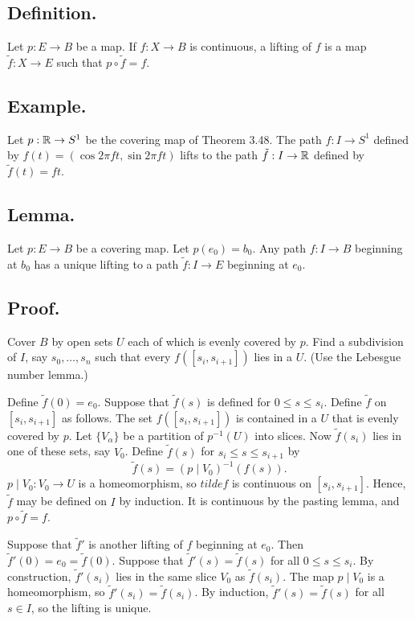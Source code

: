 \documentclass[titlepage]{article}
\begin{document}
\subsection{Definition.} Let $p: E \to B$ be a map. If $f: X \to B$ is continuous, a lifting of $f$ is a map $\tilde{f}: X \to E$ such that $p \circ \tilde{f} = f$.

\subsection{Example.} Let $p: \mathbb{R} \to S^{1}$ be the covering map of Theorem 3.48. The path $f: I \to S^{1}$ defined by $f(t) = (\cos 2\pi ft, \sin 2\pi ft)$ lifts to the path $\tilde{f}: I \to \mathbb{R}$ defined by $\tilde{f}(t) = ft$.

\subsection{Lemma.} Let $p: E \to B$ be a covering map. Let $p(e_{0}) = b_{0}$. Any path $f: I \to B$ beginning at $b_{0}$ has a unique lifting to a path $\tilde{f}: I \to E$ beginning at $e_{0}$.

\subsection{Proof.} Cover $B$ by open sets $U$ each of which is evenly covered by $p$.  Find a subdivision of $I$, say $s_{0}, \ldots, s_{n}$ such that every $f([s_{i}, s_{i+1}])$ lies in a $U$. (Use the Lebesgue number lemma.)

Define $\tilde{f}(0) = e_{0}$. Suppose that $\tilde{f}(s)$ is defined for $0 \leq s \leq s_{i}$. Define $\tilde{f}$ on $[s_{i}, s_{i+1}]$ as follows. The set $f([s_{i}, s_{i+1}])$ is contained in a $U$ that is evenly covered by $p$. Let $\{V_{\alpha}\}$ be a partition of $p^{-1}(U)$ into slices. Now $\tilde{f}(s_{i})$ lies in one of these sets, say $V_{0}$. Define $\tilde{f}(s)$ for $s_{i} \leq s \leq s_{i+1}$ by 
$$\tilde{f}(s) = (p \mid V_{0})^{-1}(f(s)).$$
$p \mid V_{0}: V_{0} \to U$ is a homeomorphism, so $tilde{f}$ is continuous on $[s_{i}, s_{i+1}]$. Hence, $\tilde{f}$ may be defined on $I$ by induction. It is continuous by the pasting lemma, and $p \circ \tilde{f} = f$.

Suppose that $\tilde{f}'$ is another lifting of $f$ beginning at $e_{0}$. Then $\tilde{f}'(0) = e_{0} = \tilde{f}(0)$. Suppose that $\tilde{f}'(s) = \tilde{f}(s)$ for all $0 \leq s \leq s_{i}$. By construction, $\tilde{f}'(s_{i})$ lies in the same slice $V_{0}$ as $\tilde{f}(s_{i})$. The map $p \mid V_{0}$ is a homeomorphism, so $\tilde{f}'(s_{i}) = \tilde{f}(s_{i})$. By induction, $\tilde{f}'(s) = \tilde{f}(s)$ for all $s \in I$, so the lifting is unique.
\end{document}
